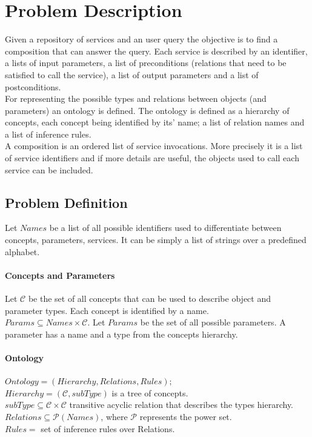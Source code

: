 \documentclass[12pt]{article}
\theoremstyle{definition}
\begin{document}
\section{Problem Description} \label{problem}
	Given a repository of services and an user query the objective is to find a composition that can answer the query.  Each service is described by an identifier, a lists of input parameters, a list of preconditions (relations that need to be satisfied to call the service), a list of output parameters and a list of postconditions. \\
	For representing the possible types and relations between objects (and parameters) an ontology is defined. The ontology is defined as a hierarchy of concepts, each concept being identified by its' name; a list of relation names and a list of inference rules. \\
	A composition is an ordered list of service invocations. More precisely it is a list of service identifiers and if more details are useful, the objects used to call each service can be included.
	\subsection {Problem Definition}
	Let $Names$ be a list of all possible identifiers used to differentiate between concepts, parameters, services. It can be simply a list of strings over a predefined alphabet.
	\paragraph{Concepts and Parameters} 
		Let $ \mathcal{C} $ be the set of all concepts that can be used to describe object and parameter types. Each concept is identified by a name. \\
		$Params \subseteq Names \times \mathcal{C}$. Let $Params$ be the set of all possible parameters. A parameter has a name and a type from the concepts hierarchy. 
	\par
	\paragraph{Ontology} $Ontology = (Hierarchy, Relations, Rules);$ \\
		$ Hierarchy = (\mathcal{C}, subType) $ is a tree of concepts. \\
		$ subType \subseteq \mathcal{C} \times \mathcal{C}$ transitive acyclic relation that describes the types hierarchy. \\  
		$ Relations \subseteq \mathcal{P}(Names)$, where $\mathcal{P}$ represents the power set.  \\
		$ Rules = $ set of inference rules over Relations.%
	\par
\end{document}
